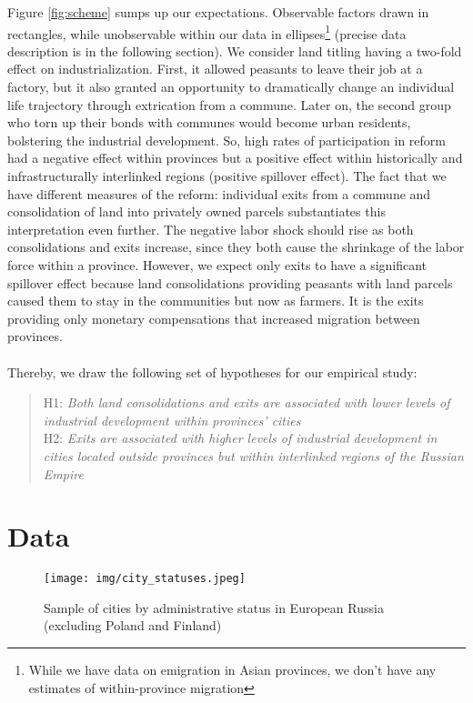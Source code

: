 \documentclass[a4paper, 12pt]{article}
\begin{document}
\noindent Figure \ref{fig:scheme} sumps up our expectations. Observable factors drawn in rectangles, while unobservable within our data in ellipses\footnote{While we have data on emigration in Asian provinces, we don't have any estimates of within-province migration} (precise data description is in the following section). We consider land titling having a two-fold effect on industrialization. First, it allowed peasants to leave their job at a factory, but it also granted an opportunity to dramatically change an individual life trajectory through extrication from a commune. Later on,  the second group who torn up their bonds with communes would become urban residents, bolstering the industrial development.  So, high rates of participation in reform had a negative effect within provinces but a positive effect within historically and infrastructurally interlinked regions (positive spillover effect).  The fact that we have different measures of the reform: individual exits from a commune and consolidation of land into privately owned parcels substantiates this interpretation even further. The negative labor shock should rise as both consolidations and exits increase, since they both cause the shrinkage of the labor force within a province. However, we expect only exits to have a  significant spillover effect because land consolidations providing peasants with land parcels caused them to stay in the communities but now as farmers. It is the exits providing only monetary compensations that increased migration between provinces. 
\\\\
\noindent Thereby, we draw the following set of hypotheses for our empirical study:
\begin{quote}
    H1: \textit{Both land consolidations and exits are associated with lower levels of industrial development within  provinces' cities}\\
    H2: \textit{Exits are associated with higher levels of industrial development in cities located outside provinces but within interlinked regions of the Russian Empire}
\end{quote}
    
\section{Data}   

    \begin{figure}[!htbp]
        \centering
        \texttt{[image: img/city\_statuses.jpeg]}
        \caption{Sample of cities by administrative status in European Russia (excluding Poland and Finland)}
        \label{fig:city_status}
    \end{figure}
    
\end{document}
